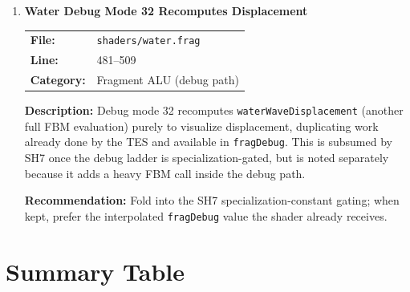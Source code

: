 \documentclass[a4paper,12pt]{article}
\newcommand{\severitybox}[2]{%
  \colorbox{#1}{\makebox[2.5cm][c]{\textcolor{white}{\textbf{#2}}}}%
}
\begin{document}
\begin{enumerate}[leftmargin=*]
\item[\textbf{[SH12]}] \textbf{Water Debug Mode 32 Recomputes Displacement}
  \hfill \severitybox{lowcolor}{LOW}

  \begin{tabular}{ll}
    \textbf{File:} & \texttt{shaders/water.frag} \\
    \textbf{Line:} & 481--509 \\
    \textbf{Category:} & Fragment ALU (debug path) \\
  \end{tabular}

  \textbf{Description:}
  Debug mode 32 recomputes \texttt{waterWaveDisplacement} (another full FBM
  evaluation) purely to visualize displacement, duplicating work already done by
  the TES and available in \texttt{fragDebug}. This is subsumed by SH7 once the
  debug ladder is specialization-gated, but is noted separately because it adds
  a heavy FBM call inside the debug path.

  \textbf{Recommendation:}
  Fold into the SH7 specialization-constant gating; when kept, prefer the
  interpolated \texttt{fragDebug} value the shader already receives.

\end{enumerate}

\newpage

\section{Summary Table}
\end{document}
